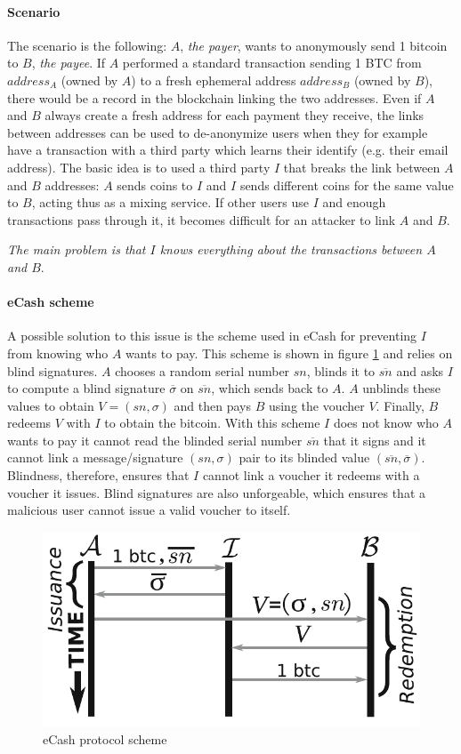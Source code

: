 \paragraph{Scenario}
The scenario is the following: $A$, \emph{the payer}, wants to anonymously send
1 bitcoin to $B$, \emph{the  payee}. If $A$ performed a standard transaction
sending 1 BTC from $address_A$ (owned by $A$) to a fresh ephemeral address
$address_B$ (owned by $B$), there would be a record in the blockchain linking
the two addresses. Even if $A$ and $B$ always create a fresh address for each
payment they receive, the links between addresses can be used to de-anonymize
users when they for example have a transaction with a third party which learns
their identify (e.g. their email address). The basic idea is to used a third
party $I$ that breaks the link between $A$ and $B$ addresses: $A$ sends coins to
$I$ and $I$ sends different coins for the same value to $B$, acting thus as a
mixing service. If other users use $I$ and enough transactions pass through it,
it becomes difficult for an attacker to link $A$ and $B$.

\emph{The main problem is that $I$ knows everything about the transactions between
$A$ and $B$}.

\paragraph{eCash scheme}
A possible solution to this issue is the scheme used in eCash for preventing $I$
from knowing who $A$ wants to pay. This scheme is shown in figure
\ref{fig:eCash-scheme} and relies on blind signatures. $A$ chooses a random
serial number $sn$, blinds it to $\overline{sn}$ and asks $I$ to compute a blind
signature $\overline\sigma$ on $\overline{sn}$, which sends back to $A$. $A$
unblinds these values to obtain $V = (sn, \sigma)$ and then pays $B$ using the
voucher $V$. Finally, $B$ redeems $V$ with $I$ to obtain the bitcoin. With this
scheme $I$ does not know who $A$ wants to pay it cannot read the blinded serial
number $\overline{sn}$ that it signs and it cannot link a message/signature
$(sn, \sigma)$ pair to its blinded value $(\overline{sn}, \overline\sigma)$.
Blindness, therefore, ensures that $I$ cannot link a voucher it redeems with a
voucher it issues. Blind signatures are also unforgeable, which ensures that a
malicious user cannot issue a valid voucher to itself.
\begin{figure}[!htb]
	\centering
	\includegraphics[width=0.6\linewidth]{img/eCash-scheme.png}
	\caption{eCash protocol scheme}
	\label{fig:eCash-scheme}
\end{figure}

